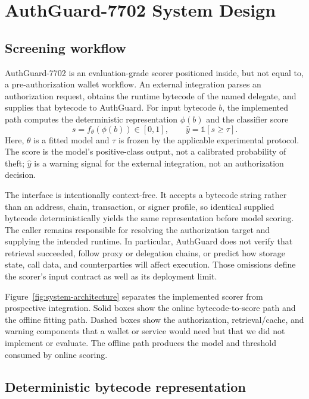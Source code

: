 \section{AuthGuard-7702 System Design}
\label{sec:design}

\subsection{Screening workflow}

AuthGuard-7702 is an evaluation-grade scorer positioned inside, but not equal to, a pre-authorization wallet workflow. An external integration parses an authorization request, obtains the runtime bytecode of the named delegate, and supplies that bytecode to AuthGuard. For input bytecode $b$, the implemented path computes the deterministic representation $\phi(b)$ and the classifier score
\begin{equation}
  s=f_{\theta}(\phi(b))\in[0,1],\qquad
  \hat{y}=\mathbb{1}[s\geq\tau].
\end{equation}
Here, $\theta$ is a fitted model and $\tau$ is frozen by the applicable experimental protocol. The score is the model's positive-class output, not a calibrated probability of theft; $\hat{y}$ is a warning signal for the external integration, not an authorization decision.

The interface is intentionally context-free. It accepts a bytecode string rather than an address, chain, transaction, or signer profile, so identical supplied bytecode deterministically yields the same representation before model scoring. The caller remains responsible for resolving the authorization target and supplying the intended runtime. In particular, AuthGuard does not verify that retrieval succeeded, follow proxy or delegation chains, or predict how storage state, call data, and counterparties will affect execution. Those omissions define the scorer's input contract as well as its deployment limit.

Figure~\ref{fig:system-architecture} separates the implemented scorer from prospective integration. Solid boxes show the online bytecode-to-score path and the offline fitting path. Dashed boxes show the authorization, retrieval/cache, and warning components that a wallet or service would need but that we did not implement or evaluate. The offline path produces the model and threshold consumed by online scoring.



\subsection{Deterministic bytecode representation}

